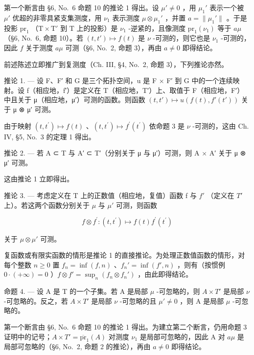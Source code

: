第一个断言由 §6, No.~6 命题 10 的推论 1 得出。设 \(\mu' \neq 0\) ，用 \(\mu_1'\) 表示一个被 \(\mu'\) 优超的非零具紧支集测度，用 \(\nu_1\) 表示测度 \(\mu \otimes \mu_1'\) ，并置 \(a = \| \mu_1'\|\) 。于是投影 \(\mathrm{pr}_1\) （\(\mathrm{T} \times \mathrm{T}'\) 到 \(\mathrm{T}\) 上的投影）是 \(\nu_1\) -逆紧的，且像测度 \(\mathrm{pr}_1(\nu_1)\) 等于 \(a\mu\) （§6, No.~6, 命题 10）。若 \((t, t') \mapsto f(t)\) 是 \(\nu\) -可测的，则它也是 \(\nu_1\) -可测的，因此 \(f\) 关于测度 \(a\mu\) 可测（§6, No.~2, 命题 3），再由 \(a \neq 0\) 即得结论。

前述陈述立即推广到复测度（Ch. III, §4, No.~2, 命题 3），下列推论亦然。

推论 1. --- 设 F、F′ 和 G 是三个拓扑空间，u 是 F × F′ 到 G 中的一个连续映射。设 f（相应地，f′）是定义在 T（相应地，T′）上、取值于 F（相应地，F′）中且关于 μ（相应地，μ′）可测的函数。则函数 \((t, t') \mapsto u(f(t), f'(t'))\) 关于 μ ⊗ μ′ 可测。

由于映射 \((t,t^{\prime})\mapsto f(t)\) 、\((t,t^{\prime})\mapsto f^{\prime}(t^{\prime})\) 依命题 3 是 \(\nu\) -可测的，这由 Ch. IV, §5, No.~3 的定理 1 得出。

推论 2. --- 若 A ⊂ T 与 A′ ⊂ T′（分别关于 μ 与 μ′）可测，则 A × A′ 关于 μ ⊗ μ′ 可测。

这由推论 1 立即得出。

推论 3. --- 考虑定义在 T 上的正数值（相应地，复值）函数 f 与 \(f'\) （定义在 \(T'\) 上）。若这两个函数分别关于 \(\mu\) 与 \(\mu'\) 可测，则函数

\[
f \otimes f ^ {\prime}: (t, t ^ {\prime}) \mapsto f (t) f ^ {\prime} (t ^ {\prime})
\]

关于 \(\mu \otimes \mu'\) 可测。

复函数或有限实函数的情形是推论 1 的直接推论。为处理正数值函数的情形，对每个整数 \(n \geqslant 0\) 置 \(f_n = \inf(f, n)\) 、\(f_n' = \inf(f', n)\) ，则有（按惯例 \(0 \cdot (+\infty) = 0\) ）\(f \otimes f' = \sup_n(f_n \otimes f_n')\) ，由此即得结论。

命题 4. --- 设 A 是 T 的一个子集。若 A 是局部 \(\mu\) -可忽略的，则 \(A \times T'\) 是局部 \(\nu\) -可忽略的。反之，若 \(A \times T'\) 是局部 \(\nu\) -可忽略的且 \(\mu' \neq 0\) ，则 A 是局部 \(\mu\) -可忽略的。

第一个断言由 §6, No.~6 命题 10 的推论 1 得出。为建立第二个断言，仍用命题 3 证明中的记号；\(A \times T' = \overline{\text{pr}}_{1}(A)\) 对测度 \(\nu_{1}\) 是局部可忽略的，因此 A 对 \(a\mu\) 是局部可忽略的（§6, No.~2, 命题 2 的推论），再由 \(a \neq 0\) 即得结论。


